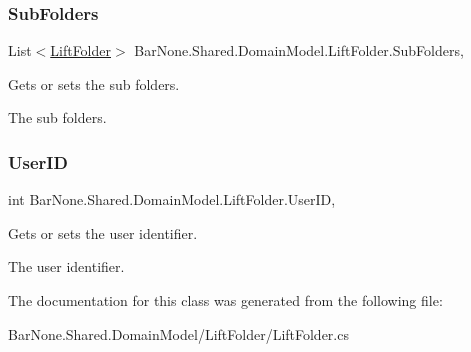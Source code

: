 \subsubsection{\texorpdfstring{Sub\+Folders}{SubFolders}}
{\footnotesize\ttfamily List$<$\mbox{\hyperlink{class_bar_none_1_1_shared_1_1_domain_model_1_1_lift_folder}{Lift\+Folder}}$>$ Bar\+None.\+Shared.\+Domain\+Model.\+Lift\+Folder.\+Sub\+Folders\hspace{0.3cm}{\ttfamily [get]}, {\ttfamily [set]}}



Gets or sets the sub folders. 

The sub folders. \mbox{\label{class_bar_none_1_1_shared_1_1_domain_model_1_1_lift_folder_ac4be3e61c6d383a6b8adc1d50c1784da}} 
\subsubsection{\texorpdfstring{User\+ID}{UserID}}
{\footnotesize\ttfamily int Bar\+None.\+Shared.\+Domain\+Model.\+Lift\+Folder.\+User\+ID\hspace{0.3cm}{\ttfamily [get]}, {\ttfamily [set]}}



Gets or sets the user identifier. 

The user identifier. 

The documentation for this class was generated from the following file\+:\begin{DoxyCompactItemize}
\item 
Bar\+None.\+Shared.\+Domain\+Model/\+Lift\+Folder/Lift\+Folder.\+cs\end{DoxyCompactItemize}
